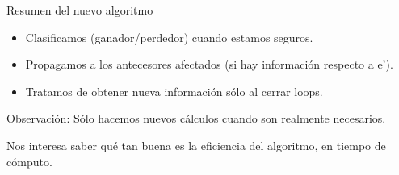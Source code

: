 \begin{frame}{Resumen del nuevo algoritmo}
    \begin{itemize}
     \item Clasificamos (ganador/perdedor) cuando estamos seguros. %
     \item Propagamos a los antecesores afectados (si hay información respecto a e').
     \item Tratamos de obtener nueva información sólo al cerrar loops.
    \end{itemize}
    
    \begin{block}{Observación:}
        Sólo hacemos nuevos cálculos cuando son realmente necesarios.
    \end{block}
    
    Nos interesa saber qué tan buena es la eficiencia del algoritmo, en tiempo de cómputo.
\end{frame}


